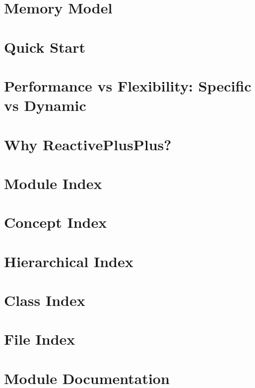 \documentclass[twoside]{book}
\newcommand{\+}{\discretionary{\mbox{\scriptsize$\hookleftarrow$}}{}{}}
\begin{document}
\chapter{Memory Model}
\label{md_docs_2_memory_model}

\chapter{Quick Start}
\label{md_docs_2_quick_01_start}

\chapter{Performance vs Flexibility\+: Specific vs Dynamic}
\label{md_docs_2_specific_01vs_01_dynamic}

\chapter{Why Reactive\+Plus\+Plus?}
\label{md_docs_2_why_rpp}

\chapter{Module Index}

\chapter{Concept Index}

\chapter{Hierarchical Index}

\chapter{Class Index}

\chapter{File Index}

\chapter{Module Documentation}



















\end{document}
